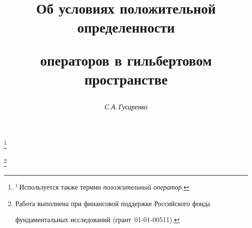 




%


\newcommand{\spc}[1]{{\bold #1}}


\newcommand{\eqdef}{\overset{\mathrm{def}}{=}{}}


\newcommand{\vraisup}{\operatornamewithlimits{vrai\;sup}}


\newcommand{\tts}[1]{}







\setcounter{page}{17}















\author{\it С.А.\,Гусаренко}




\title{Об условиях положительной определенности


операторов в гильбертовом пространстве}


\thanks{$^1$\,Используется также термин {\it положительный оператор}.}


\thanks{Работа выполнена при финансовой поддержке Российского фонда


фундаментальных исследований (грант \No\,01-01-00511).}





\date{}




\pagestyle{plain} %





